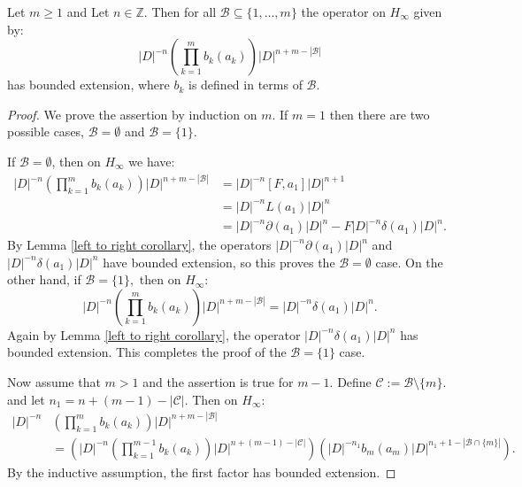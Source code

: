     \begin{lem}\label{c induction lemma}    
        Let $m\geq 1$ and Let $n\in \mathbb{Z}$. Then for all $\mathscr{B} \subseteq \{1,\ldots,m\}$ the operator on $H_\infty$ given by:
        \begin{equation*}
            |D|^{-n}\left(\prod_{k=1}^m b_k(a_k)\right)|D|^{n+m-|\mathscr{B}|}
        \end{equation*}
        has bounded extension, where $b_k$ is defined in terms of $\mathscr{B}$.
    \end{lem}
    \begin{proof} 
        We prove the assertion by induction on $m.$ If $m=1$ then there are two possible cases, $\mathscr{B} = \emptyset$ and $\mathscr{B} = \{1\}$. 
        
        If $\mathscr{B} = \emptyset$, then on $H_\infty$ we have:
        \begin{align*}
            |D|^{-n}\left(\prod_{k=1}^m b_k(a_k)\right)|D|^{n+m-|\mathscr{B}|} &= |D|^{-n}[F,a_1]|D|^{n+1}\\
                                                                    &= |D|^{-n}L(a_1)|D|^n\\
                                                                    &= |D|^{-n}\partial(a_1)|D|^n-F|D|^{-n}\delta(a_1)|D|^n.
        \end{align*}
        By Lemma \ref{left to right corollary}, the operators $|D|^{-n}\partial(a_1)|D|^n$ and $|D|^{-n}\delta(a_1)|D|^n$ have bounded extension, so this proves
        the $\mathscr{B} = \emptyset$ case. On the other hand, if $\mathscr{B} = \{1\},$ then on $H_\infty$:
        \begin{equation*}
            |D|^{-n}\left(\prod_{k=1}^m b_k(a_k) \right)|D|^{n+m-|\mathscr{B}|} = |D|^{-n}\delta(a_1)|D|^n.
        \end{equation*}
        Again by Lemma \ref{left to right corollary}, the operator $|D|^{-n}\delta(a_1)|D|^n$ has bounded extension. This completes the proof of the $\mathcal{B} = \{1\}$ case.

        Now assume that $m > 1$ and the assertion is true for $m-1$. Define $\mathscr{C} := \mathscr{B}\setminus \{m\}.$ and let $n_1 = n+(m-1)-|\mathscr{C}|$. Then on $H_\infty$:
        \begin{align} 
            |D|^{-n}&\left(\prod_{k=1}^mb_k(a_k)\right)|D|^{n+m-|\mathscr{B}|}\nonumber\\
                                                &=\left(|D|^{-n}\left(\prod_{k=1}^{m-1}b_k(a_k)\right)|D|^{n+(m-1)-|\mathscr{C}|}\right)\left(|D|^{-n_1}b_m(a_m)|D|^{n_1+1-|\mathscr{B}\cap\{m\}|}\right).\label{inductive expanded product}
        \end{align} 
        By the inductive assumption, the first factor has bounded extension.


\end{proof}

